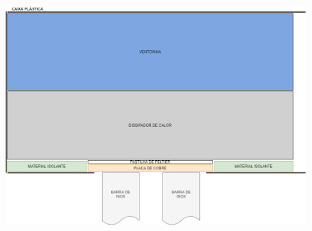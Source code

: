 \begin{figure}[H]
    \centering
    \includegraphics[scale=0.45]{figuras/implementacao/hardware/montagem.png}
    \label{fig:dispositivo_term}
\end{figure}

